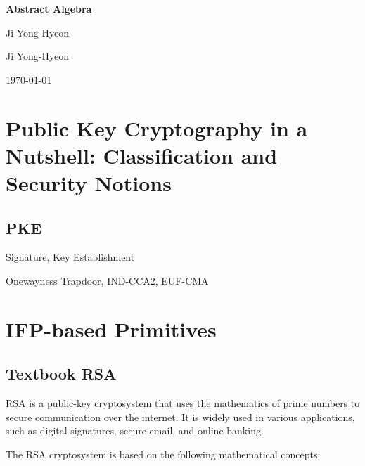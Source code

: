 \documentclass[12pt,openany]{book}
\theoremstyle{definition}
\begin{document}
	
	\begin{titlepage}
		\begin{center}
			{\Huge\textsf{\textbf{Abstract Algebra}}\par}
			\vspace{0.5in}
			{\Large Ji Yong-Hyeon\par}
			\vspace{1in}
			\vspace{1in}
			{\large Ji Yong-Hyeon\par}
			{\large \today\par}
		\end{center}
	\end{titlepage}
	
	\tableofcontents
	
	\mainmatter
	
	\chapter{Public Key Cryptography in a Nutshell: Classification and Security Notions}
	
	\section{PKE}
	Signature, Key Establishment
	
	Onewayness Trapdoor, IND-CCA2, EUF-CMA
	
	
	\newpage
	\chapter{IFP-based Primitives}
	
	\section{Textbook RSA}
	
	RSA is a public-key cryptosystem that uses the mathematics of prime numbers to secure communication over the internet. It is widely used in various applications, such as digital signatures, secure email, and online banking.
	
	The RSA cryptosystem is based on the following mathematical concepts:
	
\end{document}
